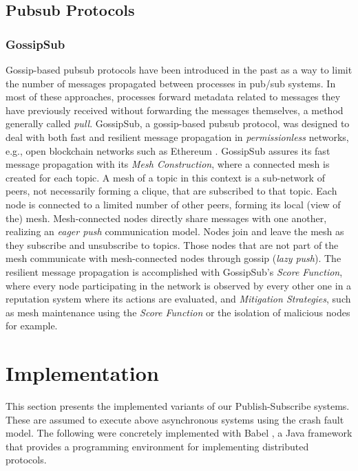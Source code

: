 \documentclass[sigconf]{acmart}
\begin{document}
\subsection{Pubsub Protocols}

\subsubsection{GossipSub} %

Gossip-based pubsub protocols have been introduced in the past as a way to limit the number of messages propagated between processes in pub/sub systems. In most of these approaches, processes forward metadata related to messages they have previously received without forwarding the messages themselves, a method generally called \textit{pull}.
GossipSub, a gossip-based pubsub protocol, was designed to deal with both fast and resilient message propagation in \textit{permissionless} networks, e.g., open blockchain networks such as Ethereum \cite{dannen2017introducing}.
GossipSub assures its fast message propagation with its \textit{Mesh Construction}, where a connected mesh is created for each topic. A mesh of a topic in this context is a sub-network of peers, not necessarily forming a clique, that are subscribed to that topic. Each node is connected to a limited number of other peers, forming its local (view of the) mesh. Mesh-connected nodes directly share messages with one another, realizing an \textit{eager push} communication model. Nodes join and leave the mesh as they subscribe and unsubscribe to topics. Those nodes that are not part of the mesh communicate with mesh-connected nodes through gossip (\textit{lazy push}).
The resilient message propagation is accomplished with GossipSub's \textit{Score Function}, where every node participating in the network is observed by every other one in a reputation system where its actions are evaluated, and \textit{Mitigation Strategies}, such as mesh maintenance using the \textit{Score Function} or the isolation of malicious nodes for example.

\section{Implementation}

This section presents the implemented variants of our Publish-Subscribe systems. These are assumed to execute above asynchronous systems using the crash fault model.
The following were concretely implemented with Babel \cite{fouto2022babel}, a Java framework that provides a programming environment for implementing distributed protocols.
\end{document}
